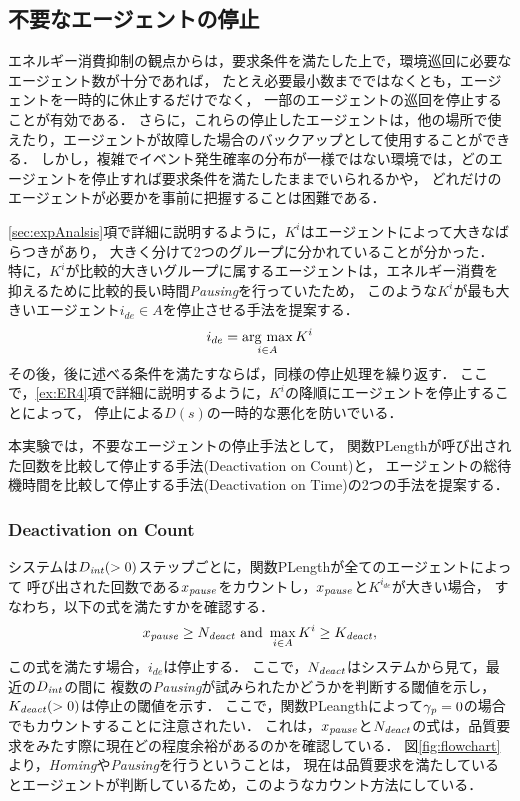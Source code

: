 \documentclass[12pt,a4j,twoside]{jarticle}
\newcommand{\argmax}{\mathop{\rm arg~max}\limits}
\def\AgentSet{A}
\def\PauseTimeFactor{{\gamma_{\it p}}}
\def\DeactCheckInterval{D_{\it int}}
\def\PauseCount{x_{\it pause}}
\def\DeactCount{N_{\it deact}}
\def\DeactThreshold{K_{\it deact}}
\begin{document}
  \subsection{不要なエージェントの停止}\label{sec:deactivation}
  エネルギー消費抑制の観点からは，要求条件を満たした上で，環境巡回に必要なエージェント数が十分であれば，
  たとえ必要最小数までではなくとも，エージェントを一時的に休止するだけでなく，
  一部のエージェントの巡回を停止することが有効である．
  さらに，これらの停止したエージェントは，他の場所で使えたり，エージェントが故障した場合のバックアップとして使用することができる．
  しかし，複雑でイベント発生確率の分布が一様ではない環境では，どのエージェントを停止すれば要求条件を満たしたままでいられるかや，
  どれだけのエージェントが必要かを事前に把握することは困難である．
  \par

  \ref{sec:expAnalsis}項で詳細に説明するように，$K^i$はエージェントによって大きなばらつきがあり，
  大きく分けて2つのグループに分かれていることが分かった．
  特に，$K^i$が比較的大きいグループに属するエージェントは，エネルギー消費を抑えるために比較的長い時間{\em Pausing}を行っていたため，
  このような$K^i$が最も大きいエージェント$i_{de}\in\AgentSet$を停止させる手法を提案する．
  \begin{equation}
    i_{de} = \argmax_{i\in\AgentSet} K^i
  \end{equation}
  その後，後に述べる条件を満たすならば，同様の停止処理を繰り返す．
  ここで，\ref{ex:ER4}項で詳細に説明するように，$K^i$の降順にエージェントを停止することによって，
  停止による$D(s)$の一時的な悪化を防いでいる．
  \par

  本実験では，不要なエージェントの停止手法として，
  関数\textsf{PLength}が呼び出された回数を比較して停止する手法(Deactivation on Count)と，
  エージェントの総待機時間を比較して停止する手法(Deactivation on Time)の2つの手法を提案する．

  \subsubsection{Deactivation on Count}\label{sec:CountStop}
  システムは$\DeactCheckInterval(> 0)$ステップごとに，関数\textsf{PLength}が全てのエージェントによって
  呼び出された回数である$\PauseCount$をカウントし，$\PauseCount$と$K^{i_{de}}$が大きい場合，
  すなわち，以下の式を満たすかを確認する．
  \begin{equation}
    \PauseCount \geq \DeactCount \textrm{ and } \max_{i\in\AgentSet}
    K^i \geq \DeactThreshold,
  \end{equation}
  この式を満たす場合，$i_{de}$は停止する．
  ここで，$\DeactCount$はシステムから見て，最近の$\DeactCheckInterval$の間に
  複数の{\em Pausing}が試みられたかどうかを判断する閾値を示し，
  $\DeactThreshold(> 0)$は停止の閾値を示す．
  ここで，関数\textsf{PLeangth}によって$\PauseTimeFactor=0$の場合でもカウントすることに注意されたい．
  これは，$\PauseCount$と$\DeactCount$の式は，品質要求をみたす際に現在どの程度余裕があるのかを確認している．
  図\ref{fig:flowchart}より，{\em Homing}や{\em Pausing}を行うということは，
  現在は品質要求を満たしているとエージェントが判断しているため，このようなカウント方法にしている．
  
\end{document}
